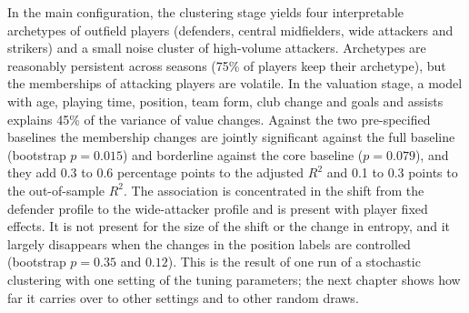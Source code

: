 In the main configuration, the clustering stage yields four interpretable archetypes of outfield players (defenders, central midfielders, wide attackers and strikers) and a small noise cluster of high-volume attackers. Archetypes are reasonably persistent across seasons (75\% of players keep their archetype), but the memberships of attacking players are volatile. In the valuation stage, a model with age, playing time, position, team form, club change and goals and assists explains 45\% of the variance of value changes. Against the two pre-specified baselines the membership changes are jointly significant against the full baseline (bootstrap $p=0.015$) and borderline against the core baseline ($p=0.079$), and they add 0.3 to 0.6 percentage points to the adjusted $R^2$ and 0.1 to 0.3 points to the out-of-sample $R^2$. The association is concentrated in the shift from the defender profile to the wide-attacker profile and is present with player fixed effects. It is not present for the size of the shift or the change in entropy, and it largely disappears when the changes in the position labels are controlled (bootstrap $p=0.35$ and $0.12$). This is the result of one run of a stochastic clustering with one setting of the tuning parameters; the next chapter shows how far it carries over to other settings and to other random draws.
